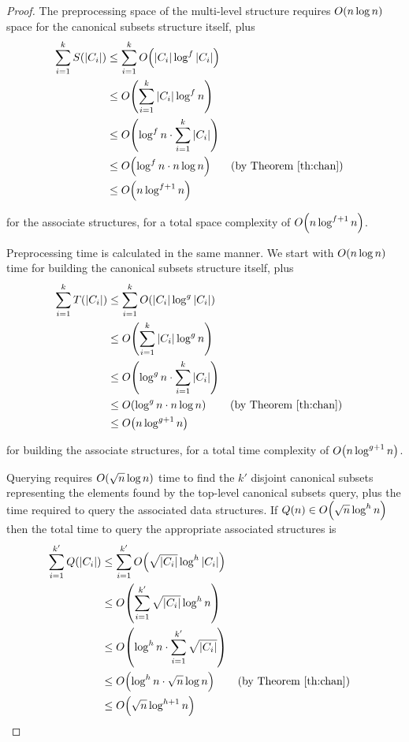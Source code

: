\begin{proof}
The preprocessing space of the multi-level structure requires $O\!\left(n \log{n}\right)$ space for the canonical subsets structure itself, plus
\begin{align*}
\sum_{i=1}^k{S(|C_i|)}
&\leq \sum_{i=1}^k{\BigOh{|C_i| \log^f{|C_i|}}} \\
%
&\leq \BigOh{\sum_{i=1}^k{|C_i| \log^f{n}}} \\
%
&\leq \BigOh{\log^f{n} \cdot \sum_{i=1}^k{|C_i|}} \\
%
&\leq \BigOh{\log^f{n} \cdot n \log{n}} && \text{(by Theorem \ref{th:chan})}\\
%
&\leq \BigOh{n\log^{f+1}{n}} \\
\end{align*}

\noindent for the associate structures, for a total space complexity of $O\!\left(n\log^{f+1}{n}\right)$.

Preprocessing time is calculated in the same manner. 
We start with $O\!\left(n \log{n}\right)$ time for building the canonical subsets structure itself, plus
\begin{align*}
\sum_{i=1}^k{T(|C_i|)}
&\leq \sum_{i=1}^k{\BigOh{|C_i| \log^g{|C_i|}}} \\
%
&\leq \BigOh{\sum_{i=1}^k{|C_i| \log^g{n}}} \\
%
&\leq \BigOh{\log^g{n} \cdot \sum_{i=1}^k{|C_i|}} \\
%
&\leq \BigOh{\log^g{n} \cdot n \log{n}} && \text{(by Theorem \ref{th:chan})} \\
%
&\leq \BigOh{n\log^{g+1}{n}} \\
\end{align*}

\noindent for building the associate structures, for a total time complexity of $O\!\left(n\log^{g+1}{n}\right)$.

Querying requires $O\!\left(\sqrt{n}\log{n}\right)$ time to find the $k'$ disjoint canonical subsets representing the elements found by the top-level canonical subsets query, plus the time required to query the associated data structures.  If $Q(n) \in O\!\left(\sqrt{n}\log^h{n}\right)$ then the total time to query the appropriate associated structures is
\begin{align*}
\sum_{i=1}^{k'}{Q(|C_i|)}
&\leq \sum_{i=1}^{k'}{\BigOh{\sqrt{|C_i|}\log^h{|C_i|}}} \\
%
&\leq \BigOh{\sum_{i=1}^{k'}{\sqrt{|C_i|}\log^h{n}}} \\
%
&\leq \BigOh{\log^h{n} \cdot \sum_{i=1}^{k'}{\sqrt{|C_i|}}} \\
%
&\leq \BigOh{\log^h{n} \cdot \sqrt{n}\log{n}}  && \text{(by Theorem \ref{th:chan})} \\
%
&\leq \BigOh{\sqrt{n}\log^{h+1}{n}} \\
\end{align*}


\end{proof}
